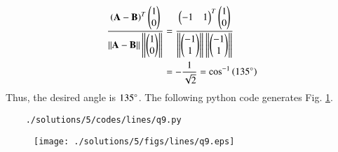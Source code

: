 
	\begin{align}
\frac{ \left(\mathbf{A}-\mathbf{B}\right)^T\begin{pmatrix}1 \\ 0\end{pmatrix}}{\left\lVert\mathbf{A}-\mathbf{B}\right\rVert\left\lVert\begin{pmatrix}1 \\ 0\end{pmatrix}\right\rVert} &= \frac{\begin{pmatrix}-1 &1\end{pmatrix}^T\begin{pmatrix}1 \\ 0\end{pmatrix}}{\left\lVert\begin{pmatrix}-1 \\1\end{pmatrix}\right\rVert\left\lVert\begin{pmatrix}-1 \\1\end{pmatrix}\right\rVert}
\\
&= -\frac{1}{\sqrt{2}} = \cos ^{-1}\left(135\degree\right)
	\end{align}
Thus, the desired angle is $135\degree$.
	The following python code generates Fig. \ref{fig:3.5.5_qnine}.
	\begin{lstlisting}
	./solutions/5/codes/lines/q9.py
	\end{lstlisting}

	\begin{figure}[!ht]
	\centering
	\texttt{[image: ./solutions/5/figs/lines/q9.eps]}
	\caption{}
	\label{fig:3.5.5_qnine}	
	\end{figure}
	

